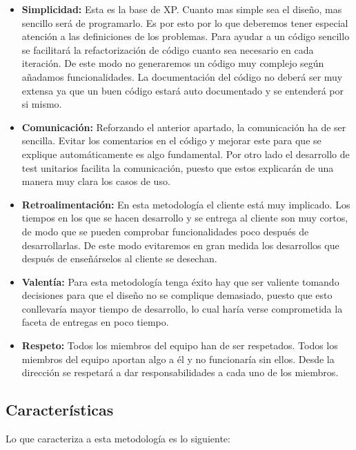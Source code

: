\begin{itemize}
  \item \textbf{Simplicidad:} Esta es la base de XP. Cuanto mas simple sea el diseño, mas sencillo será de programarlo. Es por esto
    por lo que deberemos tener especial atención a las definiciones de los problemas. Para ayudar a un código sencillo se facilitará
    la refactorización de código cuanto sea necesario en cada iteración. De este modo no generaremos un código muy complejo según
    añadamos funcionalidades. La documentación del código no deberá ser muy extensa ya que un buen código estará auto documentado
    y se entenderá por si mismo.
  \item \textbf{Comunicación:} Reforzando el anterior apartado, la comunicación ha de ser sencilla. Evitar los comentarios
    en el código y mejorar este para que se explique automáticamente es algo fundamental. Por otro lado el desarrollo
    de test unitarios facilita la comunicación, puesto que estos explicarán de una manera muy clara los casos de uso.
  \item \textbf{Retroalimentación:} En esta metodología el cliente está muy implicado. Los tiempos en los que se hacen
    desarrollo y se entrega al cliente son muy cortos, de modo que se pueden comprobar funcionalidades poco después
    de desarrollarlas. De este modo evitaremos en gran medida los desarrollos que después de enseñárselos al cliente se desechan.
  \item \textbf{Valentía:} Para esta metodología tenga éxito hay que ser valiente tomando decisiones para que el diseño no se complique
    demasiado, puesto que esto conllevaría mayor tiempo de desarrollo, lo cual haría verse comprometida la faceta de entregas
    en poco tiempo.
  \item \textbf{Respeto:} Todos los miembros del equipo han de ser respetados. Todos los miembros del equipo aportan
    algo a él y no funcionaría sin ellos. Desde la dirección se respetará a dar responsabilidades a cada uno de los miembros.
\end{itemize}

\subsection{Características}

Lo que caracteriza a esta metodología es lo siguiente:

